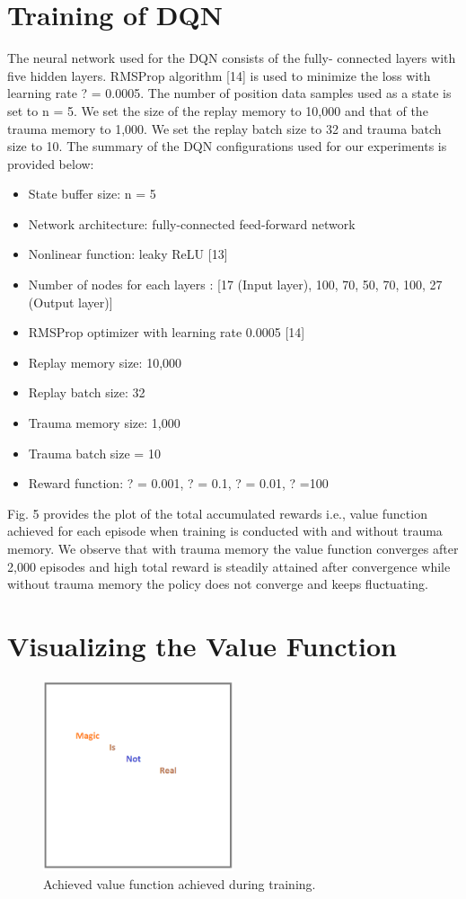 \section{Training of DQN}

The neural network used for the DQN consists of the fully- connected layers with five hidden layers. RMSProp algorithm [14] is used to minimize the loss with learning rate ? = 0.0005. The number of position data samples used as a state is set to n = 5. We set the size of the replay memory to 10,000 and that of the trauma memory to 1,000. We set the replay batch size to 32 and trauma batch size to 10. The summary of the DQN configurations used for our experiments is provided below:

\begin{itemize}
\item State buffer size: n = 5
\item Network architecture: fully-connected feed-forward network
\item Nonlinear function: leaky ReLU [13]
\item Number of nodes for each layers : [17 (Input layer), 100, 70, 50, 70, 100, 27 (Output layer)]
\item RMSProp optimizer with learning rate 0.0005 [14]
\item Replay memory size: 10,000
\item Replay batch size: 32
\item Trauma memory size: 1,000
\item Trauma batch size = 10
\item Reward function: ? = 0.001, ? = 0.1, ? = 0.01, ? =100
\end{itemize}

Fig. 5 provides the plot of the total accumulated rewards i.e., value function achieved for each episode when training is conducted with and without trauma memory. We observe that with trauma memory the value function converges after 2,000 episodes and high total reward is steadily attained after convergence while without trauma memory the policy does not converge and keeps fluctuating.

\section{Visualizing the Value Function}

\begin{figure}[h]
\centering
\includegraphics[width=0.5\textwidth]{figs/magic}
\caption{Achieved value function achieved during training.}
\end{figure}

